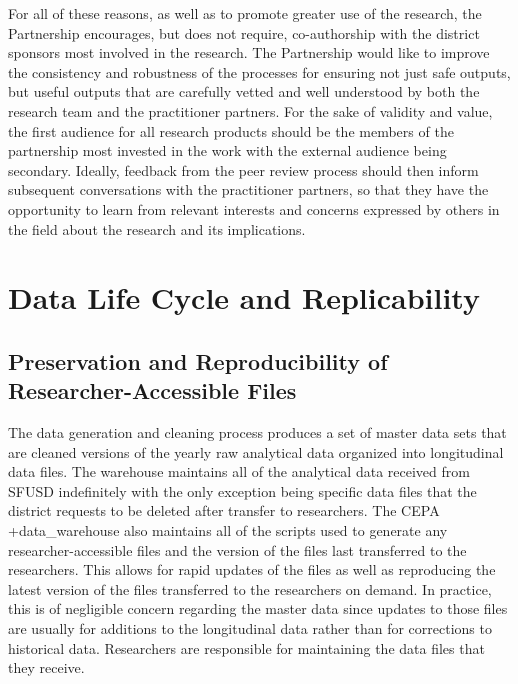 \documentclass[
]{book}
\begin{document}
For all of these reasons, as well as to promote greater use of the research, the Partnership encourages, but does not require, co-authorship with the district sponsors most involved in the research. The Partnership would like to improve the consistency and robustness of the processes for ensuring not just safe outputs, but useful outputs that are carefully vetted and well understood by both the research team and the practitioner partners. For the sake of validity and value, the first audience for all research products should be the members of the partnership most invested in the work with the external audience being secondary. Ideally, feedback from the peer review process should then inform subsequent conversations with the practitioner partners, so that they have the opportunity to learn from relevant interests and concerns expressed by others in the field about the research and its implications.

\hypertarget{data-life-cycle-and-replicability-4}{%
\section{Data Life Cycle and Replicability}\label{data-life-cycle-and-replicability-4}}

\hypertarget{preservation-and-reproducibility-of-researcher-accessible-files-4}{%
\subsection{Preservation and Reproducibility of Researcher-Accessible Files}\label{preservation-and-reproducibility-of-researcher-accessible-files-4}}

The data generation and cleaning process produces a set of master data sets that are cleaned versions of the yearly raw analytical data organized into longitudinal data files. The warehouse maintains all of the analytical data received from SFUSD indefinitely with the only exception being specific data files that the district requests to be deleted after transfer to researchers. The CEPA +data\_warehouse\textbar{} also maintains all of the scripts used to generate any researcher-accessible files and the version of the files last transferred to the researchers. This allows for rapid updates of the files as well as reproducing the latest version of the files transferred to the researchers on demand. In practice, this is of negligible concern regarding the master data since updates to those files are usually for additions to the longitudinal data rather than for corrections to historical data. Researchers are responsible for maintaining the data files that they receive.
\end{document}
